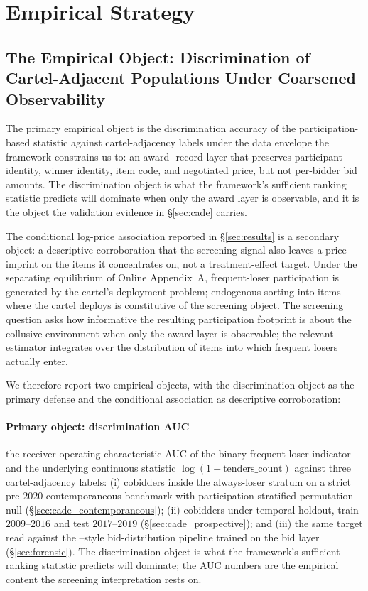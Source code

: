 \section{Empirical Strategy}
\label{sec:empirical}

\subsection{The Empirical Object: Discrimination of Cartel-Adjacent
Populations Under Coarsened Observability}
\label{sec:emp_estimand}

The primary empirical object is the discrimination accuracy of the
participation-based statistic against cartel-adjacency labels
under the data envelope the framework constrains us to: an award-
record layer that preserves participant identity, winner identity,
item code, and negotiated price, but not per-bidder bid amounts.
The discrimination object is what the framework's sufficient
ranking statistic predicts will dominate when only the award layer
is observable, and it is the object the validation evidence in
\S\ref{sec:cade} carries.

The conditional log-price association reported in
\S\ref{sec:results} is a secondary object: a descriptive
corroboration that the screening signal also leaves a price
imprint on the items it concentrates on, not a treatment-effect
target. Under the separating equilibrium of Online Appendix~A,
frequent-loser participation is generated by the cartel's
deployment problem; endogenous sorting into items where the
cartel deploys is constitutive of the screening object. The
screening question asks how informative the resulting
participation footprint is about the collusive environment when
only the award layer is observable; the relevant estimator
integrates over the distribution of items into which frequent
losers actually enter.

We therefore report two empirical objects, with the discrimination
object as the primary defense and the conditional association as
descriptive corroboration:

\paragraph{Primary object: discrimination AUC} the receiver-operating
characteristic AUC of the binary frequent-loser indicator and the
underlying continuous statistic $\log(1+\text{tenders\_count})$
against three cartel-adjacency labels: (i) cobidders inside the
always-loser stratum on a strict pre-$2020$ contemporaneous
benchmark with participation-stratified permutation null
(\S\ref{sec:cade_contemporaneous}); (ii) cobidders under temporal
holdout, train $2009$--$2016$ and test $2017$--$2019$
(\S\ref{sec:cade_prospective}); and (iii) the same target read
against the \citet{imhof2019detecting}--style bid-distribution
pipeline trained on the bid layer (\S\ref{sec:forensic}). The
discrimination object is what the framework's sufficient ranking
statistic predicts will dominate; the AUC numbers are the
empirical content the screening interpretation rests on.

